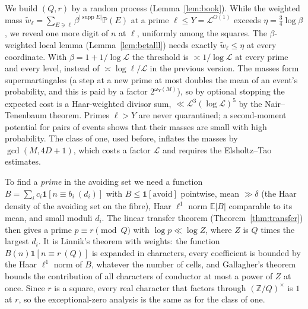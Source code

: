 \documentclass[11pt,reqno]{amsart}
\theoremstyle{definition}
\newcommand{\Lc}{\mathcal L}
\newcommand{\E}{\mathbb E}
\newcommand{\PP}{\mathbb P}
\newcommand{\supp}{\operatorname{supp}}
\begin{document}
We build $(Q,r)$ by a random process (Lemma~\ref{lem:book}).  While the
weighted mass $\tilde w_\ell=\sum_{E\ni\ell}\beta^{|\supp E|}\PP(E)$ at a prime $\ell\le Y=\Lc^{O(1)}$
exceeds $\eta=\frac34\log\beta$, we reveal one more digit of $n$ at $\ell$,
uniformly among the squares.  The $\beta$-weighted local lemma
(Lemma~\ref{lem:betalll}) needs exactly $\tilde w_\ell\le\eta$ at every
coordinate.  With $\beta=1+1/\log\Lc$ the threshold is $\asymp1/\log\Lc$ at every
prime and every level, instead of $\asymp\log\ell/\Lc$ in the previous version.
The masses form supermartingales (a step at a new prime at most doubles the
mean of an event's probability, and this is paid by a factor $2^{\omega_Y(M)}$),
so by optional stopping the expected cost is a Haar-weighted divisor sum,
$\ll\Lc^3(\log\Lc)^5$ by the Nair--Tenenbaum theorem.  Primes $\ell>Y$ are never
quarantined; a second-moment potential for pairs of events shows that their
masses are small with high probability.  The class of one, used before,
inflates the masses by $\gcd(M,4D+1)$, which costs a factor $\Lc$ and requires
the Elsholtz--Tao estimates.

To find a \emph{prime} in the avoiding set we need a function
$B=\sum_ic_i\mathbf 1[n\equiv b_i\ (d_i)]$ with $B\le\mathbf 1[\text{avoid}]$
pointwise, mean $\gg\delta$ (the Haar density of the avoiding set on the
fibre), Haar $\ell^1$ norm $\E|B|$ comparable to its mean, and small moduli
$d_i$.  The linear transfer theorem (Theorem~\ref{thm:transfer}) then gives a
prime $p\equiv r\pmod Q$ with $\log p\ll\log Z$, where $Z$ is $Q$ times the
largest $d_i$.  It is Linnik's theorem with weights: the function
$B(n)\mathbf 1[n\equiv r\ (Q)]$ is expanded in characters, every coefficient is
bounded by the Haar $\ell^1$ norm of $B$, whatever the number of cells, and
Gallagher's theorem bounds the contribution of all characters of conductor
at most a power of $Z$ at once.  Since $r$ is a square, every real character
that factors through $(\mathbb Z/Q)^\times$ is $1$ at $r$, so the exceptional-zero
analysis is the same as for the class of one.
\end{document}
